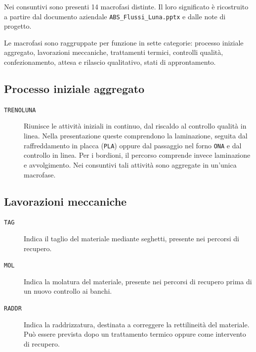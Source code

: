 Nei consuntivi sono presenti 14 macrofasi distinte. Il loro significato è ricostruito a partire dal documento aziendale \texttt{ABS\_Flussi\_Luna.pptx} e dalle note di progetto.

Le macrofasi sono raggruppate per funzione in sette categorie: processo iniziale aggregato, lavorazioni meccaniche, trattamenti termici, controlli qualità, confezionamento, attesa e rilascio qualitativo, stati di approntamento.

\subsection{Processo iniziale aggregato}

\begin{description}
\item[\texttt{TRENOLUNA}] Riunisce le attività iniziali in continuo, dal riscaldo al controllo qualità in linea. Nella presentazione queste comprendono la laminazione, seguita dal raffreddamento in placca (\texttt{PLA}) oppure dal passaggio nel forno \texttt{ONA} e dal controllo in linea. Per i bordioni, il percorso comprende invece laminazione e avvolgimento. Nei consuntivi tali attività sono aggregate in un’unica macrofase.
\end{description}

\subsection{Lavorazioni meccaniche}

\begin{description}
\item[\texttt{TAG}] Indica il taglio del materiale mediante seghetti, presente nei percorsi di recupero.

\item[\texttt{MOL}] Indica la molatura del materiale, presente nei percorsi di recupero prima di un nuovo controllo ai banchi.

\item[\texttt{RADDR}] Indica la raddrizzatura, destinata a correggere la rettilineità del materiale. Può essere prevista dopo un trattamento termico oppure come intervento di recupero.
\end{description}


